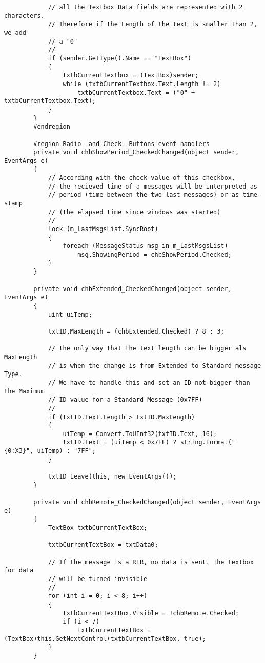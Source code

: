 \begin{lstlisting}
            // all the Textbox Data fields are represented with 2 characters.
            // Therefore if the Length of the text is smaller than 2, we add
            // a "0"
            //
            if (sender.GetType().Name == "TextBox")
            {
                txtbCurrentTextbox = (TextBox)sender;
                while (txtbCurrentTextbox.Text.Length != 2)
                    txtbCurrentTextbox.Text = ("0" + txtbCurrentTextbox.Text);
            }
        }
        #endregion

        #region Radio- and Check- Buttons event-handlers
        private void chbShowPeriod_CheckedChanged(object sender, EventArgs e)
        {
            // According with the check-value of this checkbox,
            // the recieved time of a messages will be interpreted as
            // period (time between the two last messages) or as time-stamp
            // (the elapsed time since windows was started)
            //
            lock (m_LastMsgsList.SyncRoot)
            {
                foreach (MessageStatus msg in m_LastMsgsList)
                    msg.ShowingPeriod = chbShowPeriod.Checked;
            }
        }

        private void chbExtended_CheckedChanged(object sender, EventArgs e)
        {
            uint uiTemp;

            txtID.MaxLength = (chbExtended.Checked) ? 8 : 3;

            // the only way that the text length can be bigger als MaxLength
            // is when the change is from Extended to Standard message Type.
            // We have to handle this and set an ID not bigger than the Maximum
            // ID value for a Standard Message (0x7FF)
            //
            if (txtID.Text.Length > txtID.MaxLength)
            {
                uiTemp = Convert.ToUInt32(txtID.Text, 16);
                txtID.Text = (uiTemp < 0x7FF) ? string.Format("{0:X3}", uiTemp) : "7FF";
            }

            txtID_Leave(this, new EventArgs());
        }

        private void chbRemote_CheckedChanged(object sender, EventArgs e)
        {
            TextBox txtbCurrentTextBox;

            txtbCurrentTextBox = txtData0;

            // If the message is a RTR, no data is sent. The textbox for data
            // will be turned invisible
            //
            for (int i = 0; i < 8; i++)
            {
                txtbCurrentTextBox.Visible = !chbRemote.Checked;
                if (i < 7)
                    txtbCurrentTextBox = (TextBox)this.GetNextControl(txtbCurrentTextBox, true);
            }
        }


\end{lstlisting}
